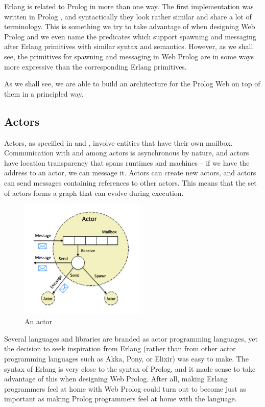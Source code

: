 \documentclass{tlp}
\begin{document}
\noindent Erlang is related to Prolog in more than one way. The first implementation was written in Prolog \cite{DBLP:conf/hopl/Armstrong07}, and syntactically they look rather similar and share a lot of terminology. This is something we try to take advantage of when designing Web Prolog and we even name the predicates which support spawning and messaging after Erlang primitives with similar syntax and semantics. However, as we shall see, the primitives for spawning and messaging in Web Prolog are in some ways more expressive than the corresponding Erlang primitives.

As we shall see, we are able to build an architecture for the Prolog Web on top of them in a principled way.

\subsection{Actors}

\noindent Actors, as specified in \cite{DBLP:conf/ijcai/HewittBS73} and \cite{Agha:1986:AMC:7929}, involve entities that have their own mailbox. Communication with and among actors is asynchronous by nature, and actors have location transparency that spans runtimes and machines -- if we have the address to an actor, we can message it. Actors can create new actors, and actors can send messages containing references to other actors. This means that the set of actors forms a graph that can evolve during execution.

\begin{figure}[h]
    \centering
	\includegraphics[width=6cm]{actors}
    \caption{An actor}
    \label{fig:actor}
\end{figure}

\noindent Several languages and libraries are branded as actor programming languages, yet the decision to seek inspiration from Erlang (rather than from other actor programming languages such as Akka, Pony, or Elixir) was easy to make. The syntax of Erlang is very close to the syntax of Prolog, and it made sense to take advantage of this when designing Web Prolog. After all, making Erlang programmers feel at home with Web Prolog could turn out to become just as important as making Prolog programmers feel at home with the language.
\end{document}
